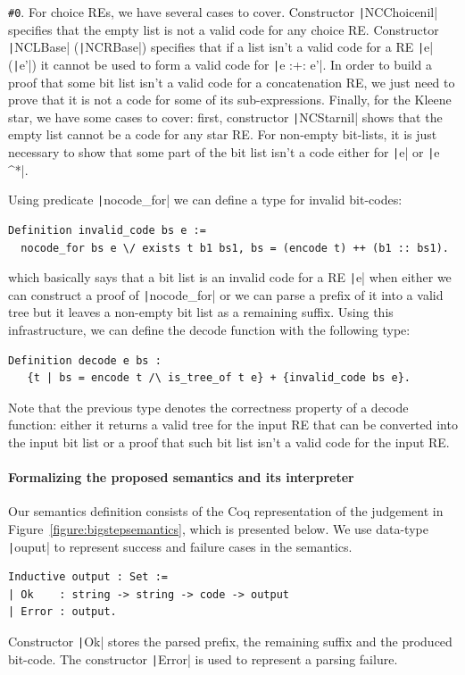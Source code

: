 \documentclass[review]{elsarticle}
\newcommand{\coq}[1]{\texttt|#1|}
\theoremstyle{definition}
\begin{document}
\texttt{\#0}. For choice REs, we have several cases to cover. Constructor
\coq{NCChoicenil} specifies that the empty list is not a valid code for any
choice RE. Constructor \coq{NCLBase} (\coq{NCRBase}) specifies that if a list
isn't a valid code for a RE \coq{e} (\coq{e'}) it cannot be used to form a valid
code for \coq{e :+: e'}. In order to build a proof that some bit list isn't a
valid code for a concatenation RE, we just need to prove that it is not a code
for some of its sub-expressions. Finally, for the Kleene star, we have some
cases to cover: first, constructor \coq{NCStarnil} shows that the empty list
cannot be a code for any star RE. For non-empty bit-lists, it is just necessary
to show that some part of the bit list isn't a code either for \coq{e} or
\coq{e ^*}.

Using predicate \coq{nocode_for} we can define a type for invalid bit-codes:
\begin{verbatim}
Definition invalid_code bs e :=
  nocode_for bs e \/ exists t b1 bs1, bs = (encode t) ++ (b1 :: bs1).
\end{verbatim}
which basically says that a bit list is an invalid code for a RE \coq{e} when
either we can construct a proof of \coq{nocode_for} or we can parse a prefix of it into a
valid tree but it leaves a non-empty bit list as a remaining suffix. Using this
infrastructure, we can define the decode function with the following type:
\begin{verbatim}
Definition decode e bs : 
   {t | bs = encode t /\ is_tree_of t e} + {invalid_code bs e}.
\end{verbatim}
Note that the previous type denotes the correctness property of a decode
function: either it returns a valid tree for the input RE that can be
converted into the input bit list or a proof that such bit list isn't a valid
code for the input RE.

\paragraph{Formalizing the proposed semantics and its interpreter}

Our semantics definition consists of the Coq representation of the judgement in
Figure~\ref{figure:bigstepsemantics}, which is presented below. We use data-type
\coq{ouput} to represent success and failure cases in the semantics.
\begin{verbatim}
Inductive output : Set := 
| Ok    : string -> string -> code -> output
| Error : output.
\end{verbatim}
Constructor \coq{Ok} stores the parsed prefix, the remaining suffix and the
produced bit-code. The constructor \coq{Error} is used to represent a
parsing failure.
\end{document}
